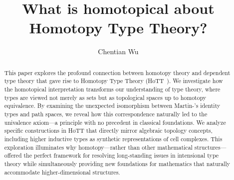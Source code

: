 \documentclass[12pt]{amsart}
\title{What is homotopical about Homotopy Type Theory?}
\author{Chentian Wu}
\date{}
\begin{document}
\maketitle

\begin{abstract}
  This paper explores the profound connection between homotopy theory and dependent type theory that gave rise to Homotopy Type Theory (HoTT~\cite{hottbook}). We investigate how the homotopical interpretation transforms our understanding of type theory, where types are viewed not merely as sets but as topological spaces up to homotopy equivalence. By examining the unexpected isomorphism between Martin-\Lof's identity types and path spaces, we reveal how this correspondence naturally led to the univalence axiom—a principle with no precedent in classical foundations. We analyze specific constructions in HoTT that directly mirror algebraic topology concepts, including higher inductive types as synthetic representations of cell complexes. This exploration illuminates why homotopy—rather than other mathematical structures—offered the perfect framework for resolving long-standing issues in intensional type theory while simultaneously providing new foundations for mathematics that naturally accommodate higher-dimensional structures.
\end{abstract}

\tableofcontents










\end{document}
